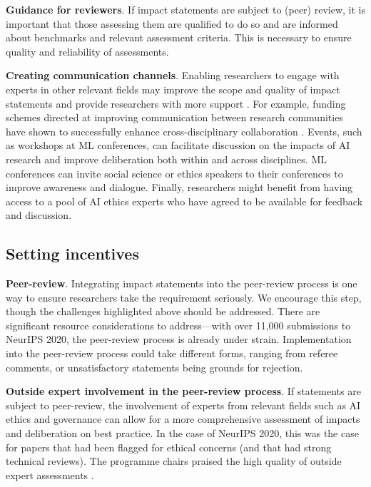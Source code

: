\documentclass[11pt,english]{article}
\begin{document}
	\textbf{Guidance for reviewers}. If impact statements are subject to (peer) review, it is important that those assessing them are qualified to do so and are informed about benchmarks and relevant assessment criteria. This is necessary to ensure quality and reliability of assessments. 
	
	\textbf{Creating communication channels}. Enabling researchers to engage with experts in other relevant fields may improve the scope and quality of impact statements and provide researchers with more support \citep{owen_responsible_2010}. For example, funding schemes directed at improving communication between research communities have shown to successfully enhance cross-disciplinary collaboration  \citep{porter_research_2012}. Events, such as workshops at ML conferences, can facilitate discussion on the impacts of AI research and improve deliberation both within and across disciplines. ML conferences can invite social science or ethics speakers to their conferences to improve awareness and dialogue. Finally, researchers might benefit from having access to a pool of AI ethics experts who have agreed to be available for feedback and discussion.
	
	\subsection*{Setting incentives}
	
	\textbf{Peer-review}. Integrating impact statements into the peer-review process is one way to ensure researchers take the requirement seriously. We encourage this step, though the challenges highlighted above should be addressed. There are significant resource considerations to address---with over 11,000 submissions to NeurIPS 2020, the peer-review process is already under strain. Implementation into the peer-review process could take different forms, ranging from referee comments, or unsatisfactory statements being grounds for rejection.
	
	\textbf{Outside expert involvement in the peer-review process}. If statements are subject to peer-review, the involvement of experts from relevant fields such as AI ethics and governance can allow for a more comprehensive assessment of impacts and deliberation on best practice. In the case of NeurIPS 2020, this was the case for papers that had been flagged for ethical concerns (and that had strong technical reviews). The programme chairs praised the high quality of outside expert assessments \citep{lin_what_2020}.
	
\end{document}
